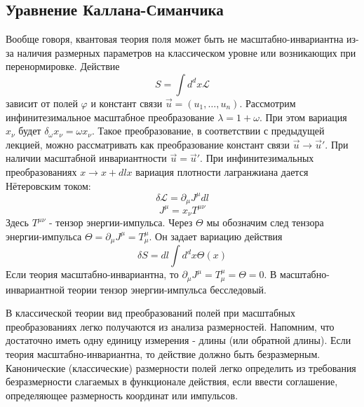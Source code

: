 \documentclass[a4paper,12pt]{article} \usepackage[utf8x]{inputenc} \usepackage[russian]{babel}
\theoremstyle{definition} \newtheorem{corollary}{Corollary}[theorem] \theoremstyle{definition}
\begin{document}
\subsection{Уравнение Каллана-Симанчика}

Вообще говоря, квантовая теория поля может быть не масштабно-инвариантна из-за наличия размерных
параметров на классическом уровне или возникающих при перенормировке. Действие
\begin{equation}
  \label{eq:73} S=\int d^dx \mathcal{L}
\end{equation} зависит от полей $\varphi$ и констант связи $\vec u=(u_1,\dots,u_n)$. Рассмотрим
инфинитезимальное масштабное преобразование $\lambda=1+\omega$. При этом вариация $x_{\nu}$ будет
$\delta_{\omega}x_{\nu}=\omega x_{\nu}$. Такое преобразование, в соответствии с предыдущей лекцией,
можно рассматривать как преобразование констант связи $\vec u\to \vec u'$. При наличии масштабной
инвариантности $\vec u = \vec u'$. При инфинитезимальных преобразованиях $x\to x+dl x$ вариация
плотности лагранжиана дается Нётеровским током:
\begin{equation}
  \label{eq:74} \delta\mathcal{L}=\partial_{\mu}J^{\mu}dl
\end{equation}
\begin{equation}
  \label{eq:75} J^{\mu}=x_{\nu}T^{\mu\nu}
\end{equation} Здесь $T^{\mu\nu}$ - тензор энергии-импульса. Через $\Theta$ мы обозначим след
тензора энергии-импульса $\Theta=\partial_{\mu}J^{\mu}=T_{\mu}^{\mu}$. Он задает вариацию действия
\begin{equation}
  \label{eq:87} \delta S=dl \int d^d x \Theta(x)
\end{equation} Если теория масштабно-инвариантна, то $\partial_{\mu}J^{\mu}=T_{\mu}^{\mu}=\Theta=0$.
В масштабно-инвариантной теории тензор энергии-импульса бесследовый.

В классической теории вид преобразований полей при масштабных преобразованиях легко получаются из
анализа размерностей. Напомним, что достаточно иметь одну единицу измерения - длины (или обратной
длины). Если теория масштабно-инвариантна, то действие должно быть безразмерным. Канонические
(классические) размерности полей легко определить из требования безразмерности слагаемых в
функционале действия, если ввести соглашение, определяющее размерность координат или импульсов.
\end{document}
